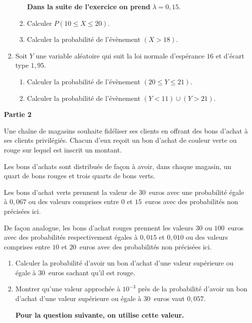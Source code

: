 \documentclass[12pt,french]{article}
\begin{document}
\begin{question}[subtitle={Métropole 2015}]
\begin{enumerate}
\begin{enumerate}
\textbf{Dans la suite de l'exercice on prend } \boldmath$\lambda = 0,15$\unboldmath.
		\item Calculer $P(10 \leqslant X \leqslant 20)$.
		\item Calculer la probabilité de l'évènement $(X > 18)$.
	\end{enumerate}
\item Soit $Y$ une variable aléatoire qui suit la loi normale d'espérance $16$ et d'écart type $1,95$.
	\begin{enumerate}
		\item Calculer la probabilité de l'évènement $(20 \leqslant Y \leqslant 21)$.
		\item Calculer la probabilité de l'évènement $(Y < 11) \cup (Y > 21)$.
	\end{enumerate}
\end{enumerate}

\bigskip
	
\textbf{Partie 2}
	
	\medskip
	
Une chaîne de magasins souhaite fidéliser ses clients en offrant des bons d'achat à ses clients
privilégiés. Chacun d'eux reçoit un bon d'achat de couleur verte ou rouge sur lequel est inscrit un montant.
	
Les bons d'achats sont distribués de façon à avoir, dans chaque magasin, un quart de bons rouges et trois quarts de bons verts.
	
Les bons d'achat verts prennent la valeur de $30$~euros avec une probabilité égale à $0,067$ ou des valeurs comprises entre $0$ et $15$~euros avec des probabilités non précisées ici.
	
De façon analogue, les bons d'achat rouges prennent les valeurs $30$ ou $100$~euros avec des probabilités respectivement égales à $0,015$ et $0,010$ ou des valeurs comprises entre $10$ et $20$~euros avec des probabilités non précisées ici.

\medskip

\begin{enumerate}
\item Calculer la probabilité d'avoir un bon d'achat d'une valeur supérieure ou égale à $30$~euros sachant qu'il est rouge.
\item Montrer qu'une valeur approchée à $10^{-3}$ près de la probabilité d'avoir un bon d'achat d'une valeur supérieure ou égale à $30$~euros vaut $0,057$.

\textbf{Pour la question suivante, on utilise cette valeur.}


\end{enumerate}
\end{question}
\end{document}
